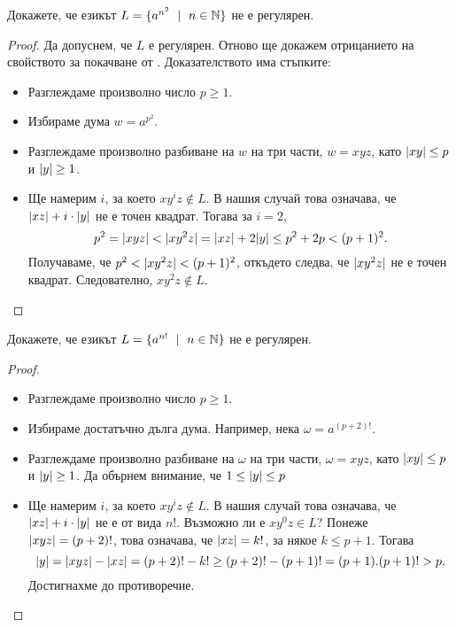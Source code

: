 \begin{problem}
  Докажете, че езикът $L = \{a^{n^2}\ \mid\ n\in\Nat\}$ не е регулярен.  
\end{problem}
\begin{proof}
  Да допуснем, че $L$ е регулярен. Отново ще докажем отрицанието на свойството за покачване от .
  Доказателството има стъпките:
  \begin{itemize}
  \item 
    Разглеждаме произволно число $p \geq 1$.
  \item
    Избираме дума $w = a^{p^2}$.
  \item
    Разглеждаме произволно разбиване на $w$ на три части, $w = xyz$, 
    като $\lvert{xy}\rvert \leq p$ и $\lvert{y}\rvert \geq 1$.
  \item
    Ще намерим $i$, за което $xy^iz \not\in L$.
    В нашия случай това означава, че $\lvert{xz}\rvert + i\cdot\lvert{y}\rvert$ не е точен квадрат.
    Тогава за $i = 2$,
    \[p^2 = \lvert{xyz}\rvert < \lvert{xy^2z}\rvert = \lvert{xz}\rvert + 2\lvert{y}\rvert \leq p^2 + 2p < (p+1)^2 .\]
    Получаваме, че $p^2 < \lvert{xy^2z}\rvert < (p+1)^2$,
    откъдето следва, че $\lvert{xy^2z}\rvert$ не е точен квадрат.
    Следователно, $xy^2z \not\in L$.
  \end{itemize}
\end{proof}

\begin{problem}
  Докажете, че езикът $L = \{a^{n!}\ \mid\ n\in\Nat\}$ не е регулярен.  
\end{problem}
\begin{proof}
    \begin{itemize}
  \item 
    Разглеждаме произволно число $p \geq 1$.
  \item
    Избираме достатъчно дълга дума. Например, нека $\omega = a^{(p+2)!}$.
  \item
    Разглеждаме произволно разбиване на $\omega$ на три части, $\omega = xyz$, 
    като $\lvert{xy}\rvert \leq p$ и $\lvert{y}\rvert \geq 1$.
    Да обърнем внимание, че $1 \leq \lvert{y}\rvert \leq p$
  \item
    Ще намерим $i$, за което $xy^iz \not\in L$.
    В нашия случай това означава, че $\lvert{xz}\rvert + i\cdot\lvert{y}\rvert$ не е от вида $n!$.
    Възможно ли е $xy^0z \in L$?
    Понеже $\lvert{xyz}\rvert = (p+2)!$, това означава, че $\lvert{xz}\rvert = k!$, за някое $k \leq p+1$.
    Тогава 
    \[\lvert{y}\rvert = \lvert{xyz}\rvert - \lvert{xz}\rvert = (p+2)! - k! \geq (p+2)! - (p+1)! = (p+1).(p+1)! > p.\]
    Достигнахме до противоречие.
  \end{itemize}
\end{proof}


